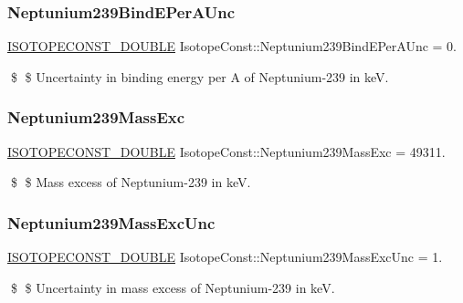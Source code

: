 \subsubsection{\texorpdfstring{Neptunium239\+Bind\+E\+Per\+A\+Unc}{Neptunium239BindEPerAUnc}}
{\footnotesize\ttfamily \mbox{\hyperlink{group___isotope_const-_macros_ga8f45a7272ce02c0b4c65c44636ed719a}{I\+S\+O\+T\+O\+P\+E\+C\+O\+N\+S\+T\+\_\+\+D\+O\+U\+B\+LE}} Isotope\+Const\+::\+Neptunium239\+Bind\+E\+Per\+A\+Unc = 0.}

\$ \$ Uncertainty in binding energy per A of Neptunium-\/239 in keV. \mbox{\label{group___isotope_const-_neptunium-_np239_ga5187c7d4d5769033c62feed1f58849a5}} 
\subsubsection{\texorpdfstring{Neptunium239\+Mass\+Exc}{Neptunium239MassExc}}
{\footnotesize\ttfamily \mbox{\hyperlink{group___isotope_const-_macros_ga8f45a7272ce02c0b4c65c44636ed719a}{I\+S\+O\+T\+O\+P\+E\+C\+O\+N\+S\+T\+\_\+\+D\+O\+U\+B\+LE}} Isotope\+Const\+::\+Neptunium239\+Mass\+Exc = 49311.}

\$ \$ Mass excess of Neptunium-\/239 in keV. \mbox{\label{group___isotope_const-_neptunium-_np239_ga5ea6f0156084e6190da31bb720d35db9}} 
\subsubsection{\texorpdfstring{Neptunium239\+Mass\+Exc\+Unc}{Neptunium239MassExcUnc}}
{\footnotesize\ttfamily \mbox{\hyperlink{group___isotope_const-_macros_ga8f45a7272ce02c0b4c65c44636ed719a}{I\+S\+O\+T\+O\+P\+E\+C\+O\+N\+S\+T\+\_\+\+D\+O\+U\+B\+LE}} Isotope\+Const\+::\+Neptunium239\+Mass\+Exc\+Unc = 1.}

\$ \$ Uncertainty in mass excess of Neptunium-\/239 in keV. \mbox{\label{group___isotope_const-_neptunium-_np239_gae1f256d7f2b34f636db1350f06a93bb5}} 
